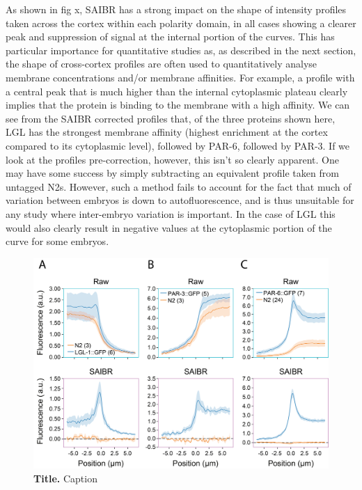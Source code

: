 \documentclass[12pt]{"article"}
\newcommand{\mycaption}[2]{\caption[#1]{\textbf{#1.} #2}}
\begin{document}
As shown in fig x, SAIBR has a strong impact on the shape of intensity profiles taken across the cortex within each polarity domain, in all cases showing a clearer peak and suppression of signal at the internal portion of the curves. This has particular importance for quantitative studies as, as described in the next section, the shape of cross-cortex profiles are often used to quantitatively analyse membrane concentrations and/or membrane affinities. For example, a profile with a central peak that is much higher than the internal cytoplasmic plateau clearly implies that the protein is binding to the membrane with a high affinity. We can see from the SAIBR corrected profiles that, of the three proteins shown here, LGL has the strongest membrane affinity (highest enrichment at the cortex compared to its cytoplasmic level), followed by PAR-6, followed by PAR-3. If we look at the profiles pre-correction, however, this isn't so clearly apparent. One may have some success by simply subtracting an equivalent profile taken from untagged N2s. However, such a method fails to account for the fact that much of variation between embryos is down to autofluorescence, and is thus unsuitable for any study where inter-embryo variation is important. In the case of LGL this would also clearly result in negative values at the cytoplasmic portion of the curve for some embryos.\\



\begin{figure}[!h]
\includegraphics[scale=1]{saibr_membrane_profiles}
\setlength{\abovecaptionskip}{20pt}
\centering
\mycaption{Title}{Caption}
\label{fig:saibr_membrane_profiles}
\end{figure}
\end{document}

